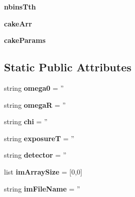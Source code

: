 \begin{DoxyCompactItemize}
\item 
\hypertarget{classmyImage_1_1myImage_a722eda5ce89e24cebc89da923364fb0b}{{\bfseries nbins\-Tth}}\label{classmyImage_1_1myImage_a722eda5ce89e24cebc89da923364fb0b}

\item 
\hypertarget{classmyImage_1_1myImage_a5320605221fb992b852046a41947a458}{{\bfseries cake\-Arr}}\label{classmyImage_1_1myImage_a5320605221fb992b852046a41947a458}

\item 
\hypertarget{classmyImage_1_1myImage_a24f984efb2d87cb956bcce7c8a626a41}{{\bfseries cake\-Params}}\label{classmyImage_1_1myImage_a24f984efb2d87cb956bcce7c8a626a41}

\end{DoxyCompactItemize}
\subsection*{Static Public Attributes}
\begin{DoxyCompactItemize}
\item 
\hypertarget{classmyImage_1_1myImage_ab9dbc690933fa5ba491388ceb1e214a0}{string {\bfseries omega0} = ''}\label{classmyImage_1_1myImage_ab9dbc690933fa5ba491388ceb1e214a0}

\item 
\hypertarget{classmyImage_1_1myImage_ab739c7aa096b85bcdcce37dcb3c5c53c}{string {\bfseries omega\-R} = ''}\label{classmyImage_1_1myImage_ab739c7aa096b85bcdcce37dcb3c5c53c}

\item 
\hypertarget{classmyImage_1_1myImage_ae0a5c8578f1aa53e8f53b522c5cf29a5}{string {\bfseries chi} = ''}\label{classmyImage_1_1myImage_ae0a5c8578f1aa53e8f53b522c5cf29a5}

\item 
\hypertarget{classmyImage_1_1myImage_aea69242e33fa2cc728dbfd434d44f3ed}{string {\bfseries exposure\-T} = ''}\label{classmyImage_1_1myImage_aea69242e33fa2cc728dbfd434d44f3ed}

\item 
\hypertarget{classmyImage_1_1myImage_a0d210dc06284b429870e79968bbcbf96}{string {\bfseries detector} = ''}\label{classmyImage_1_1myImage_a0d210dc06284b429870e79968bbcbf96}

\item 
\hypertarget{classmyImage_1_1myImage_affbde3eed0befed324a6abf5d8224553}{list {\bfseries im\-Array\-Size} = \mbox{[}0,0\mbox{]}}\label{classmyImage_1_1myImage_affbde3eed0befed324a6abf5d8224553}

\item 
\hypertarget{classmyImage_1_1myImage_a2413505e2530877553bf1c15fd5177ba}{string {\bfseries im\-File\-Name} = ''}\label{classmyImage_1_1myImage_a2413505e2530877553bf1c15fd5177ba}

\end{DoxyCompactItemize}


